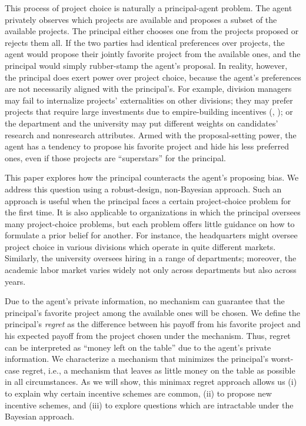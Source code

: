 \documentclass[12pt,english]{article}
\theoremstyle{remark}
\theoremstyle{plain}
\theoremstyle{definition}
\begin{document}
This process of project choice is naturally a principal-agent problem. The agent privately observes which projects are available and proposes a subset of the available projects. The principal either chooses one from the projects proposed or rejects them all. If the two parties had identical preferences over projects, the agent would propose their jointly favorite project from the available ones, and the principal would simply rubber-stamp the agent's proposal. In reality, however, the principal does exert power over project choice, because the agent's preferences are not necessarily aligned with the principal's. For example, division managers may fail to internalize projects' externalities on other divisions; they may prefer projects that require large investments due to empire-building incentives (\cite{HarrisRaviv1996}, \cite{BerkovitchIsrael2004}); or the department and the university may put different weights on candidates' research and nonresearch attributes. Armed with the proposal-setting power, the agent has a tendency to propose his favorite project and hide his less preferred ones, even if those projects are ``superstars'' for the principal. 

This paper explores how the principal counteracts the agent's proposing bias. We address this question using a robust-design, non-Bayesian approach. Such an approach is useful when the principal faces a certain project-choice problem for the first time. It is also applicable to organizations in which the principal oversees many project-choice problems, but each problem offers little guidance on how to formulate a prior belief for another. For instance, the headquarters might oversee project choice in various divisions which operate in quite different markets. Similarly, the university oversees hiring in a range of departments; moreover, the academic labor market varies widely not only across departments but also across years. 

Due to the agent's private information, no mechanism can guarantee that the principal's favorite project among the available ones will be chosen. We define the principal's \emph{regret} as the difference between his payoff from his favorite project and his expected payoff from the project chosen under the mechanism. Thus, regret can be interpreted as ``money left on the table'' due to the agent's private information. We characterize a mechanism that minimizes the principal's worst-case regret, i.e., a mechanism that leaves as little money on the table as possible in all circumstances. As we will show, this minimax regret approach allows us (i) to explain why certain incentive schemes are common, (ii) to propose new incentive schemes, and (iii) to explore questions which are intractable under the Bayesian approach. 
\end{document}
